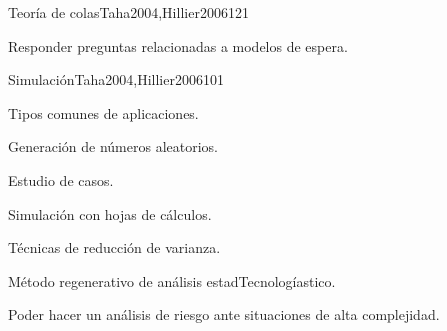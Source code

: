 \begin{syllabus}
\begin{unit}{Teoría de colas}{}{Taha2004,Hillier2006}{12}{1}
      \begin{learningoutcomes}
         \item Responder preguntas relacionadas a modelos de espera.
      \end{learningoutcomes}
   \end{unit}
   
   \begin{unit}{Simulación}{}{Taha2004,Hillier2006}{10}{1}
      \begin{topics}
         \item Tipos comunes de aplicaciones.
         \item Generación de números aleatorios.
         \item Estudio de casos.
         \item Simulación con hojas de cálculos.
         \item Técnicas de reducción de varianza.
         \item Método regenerativo de análisis estadTecnologíastico.
      \end{topics}
   
      \begin{learningoutcomes}
         \item Poder hacer un análisis de riesgo ante situaciones de alta complejidad.
      \end{learningoutcomes}
   \end{unit}
   
   \begin{coursebibliography}
   \end{coursebibliography}
   
   \end{syllabus}
   